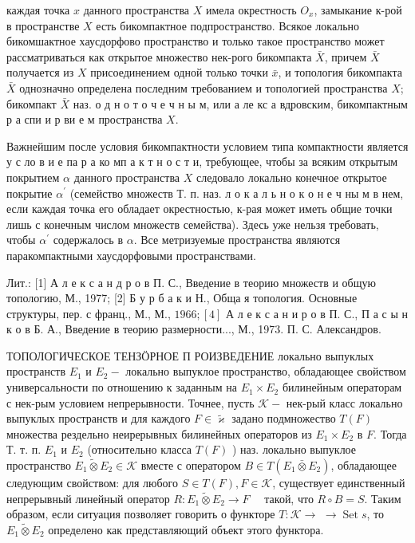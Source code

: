 \documentclass[10pt]{article}
\begin{document}
каждая точка $x$ данного пространства $X$ имела окрестность $O_{x}$, замыкание к-рой в пространстве $X$ есть бикомпактное подпространство. Всякое локально бикомшактное хаусдорфово пространство и только такое пространство может рассматриваться как открытое множество нек-рого бикомпакта $\bar{X}$, причем $\bar{X}$ получается из $X$ присоединением одной только точки $\bar{x}$, и топология бикомпакта $\bar{X}$ однозначно определена последним требованием и топологией пространства $X$; бикомпакт $\bar{X}$ наз. о д н о т о ч е ч н ы м, или а ле кс а вдровским, бикомпактным р а спи и р ви е м пространства $X$.



Важнейшим после условия бикомпактности условием типа компактности является у с ло в и е па р а ко мп а к т н о с т и, требующее, чтобы за всяким открытым покрытием $\alpha$ данного пространства $X$ следовало локально конечное открытое покрытие $\alpha^{\prime}$ (семейство множеств Т. п. наз. л о к а л ь н о к о н е ч ны м в нем, если каждая точка его обладает окрестностью, к-рая может иметь общие точки лишь с конечным числом множеств семейства). Здесь уже нельзя требовать, чтобы $\alpha^{\prime}$ содержалось в $\alpha$. Все метризуемые пространства являются паракомпактными хаусдорфовыми пространствами.



Лит.: [1] А л е к с а н д р о в П. С., Введение в теорию множеств и общую топологию, М., 1977; [2] Б у р б а к и Н., Обща я топология. Основные структуры, пер. с франц., М., М., $1966 ;[4]$ А л е к с а н и р о в П. С., П а с ы н к о в Б. А., Введение в теорию размерности..., М., 1973. П. С. Александров.



ТОПОЛОГИЧЕСКОЕ ТЕНЗӦРНОЕ П РОИЗВЕДЕНИЕ локально выпуклых пространств $E_{1}$ и $E_{2}-$ локально выпуклое пространство, обладающее свойством универсальности по отношению к заданным на $E_{1} \times E_{2}$ билинейным операторам с нек-рым условием непрерывности. Точнее, пусть $\mathscr{K}-$ нек-рый класс локально выпуклых пространств и для каждого $F \in \widetilde{\varkappa}$ задано подмножество $T(F)$ множества рездельно неирерывных билинейных операторов из $E_{1} \times E_{2}$ в $F$. Тогда Т. т. п. $E_{1}$ и $E_{2}$ (относительно класса $T(F)$ ) наз. локально выпуклое пространство $E_{1} \tilde{\otimes} E_{2} \in \mathscr{\mathcal { K }}$ вместе с оператором $B \in T\left(E_{1} \bar{\otimes} E_{2}\right)$, обладающее следующим свойством: для любого $S \in T(F), F \in \mathcal{K}$, существует единственный непрерывный линейный оператор $R: E_{1} \tilde{\otimes} E_{2} \rightarrow F \quad$ такой, что $R \circ B=S$. Таким образом, если ситуация позволяет говорить о функторе $T: \mathscr{K} \rightarrow$ $\rightarrow \operatorname{Set} s$, то $E_{1} \tilde{\otimes} E_{2}$ определено как представляющий объект этого функтора.
\end{document}
